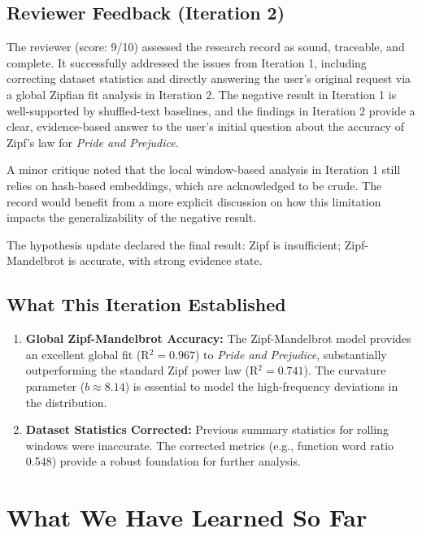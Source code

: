 \documentclass[11pt,letterpaper]{article}
\begin{document}
\subsection{Reviewer Feedback (Iteration 2)}

The reviewer (score: 9/10) assessed the research record as sound, traceable, and complete. It successfully addressed the issues from Iteration 1, including correcting dataset statistics and directly answering the user's original request via a global Zipfian fit analysis in Iteration 2. The negative result in Iteration 1 is well-supported by shuffled-text baselines, and the findings in Iteration 2 provide a clear, evidence-based answer to the user's initial question about the accuracy of Zipf's law for \textit{Pride and Prejudice}.

A minor critique noted that the local window-based analysis in Iteration 1 still relies on hash-based embeddings, which are acknowledged to be crude. The record would benefit from a more explicit discussion on how this limitation impacts the generalizability of the negative result.

The hypothesis update declared the final result: Zipf is insufficient; Zipf-Mandelbrot is accurate, with strong evidence state.

\subsection{What This Iteration Established}

\begin{enumerate}
\item \textbf{Global Zipf-Mandelbrot Accuracy:} The Zipf-Mandelbrot model provides an excellent global fit (R$^2=0.967$) to \textit{Pride and Prejudice}, substantially outperforming the standard Zipf power law (R$^2=0.741$). The curvature parameter ($b \approx 8.14$) is essential to model the high-frequency deviations in the distribution.
\item \textbf{Dataset Statistics Corrected:} Previous summary statistics for rolling windows were inaccurate. The corrected metrics (e.g., function word ratio 0.548) provide a robust foundation for further analysis.
\end{enumerate}

\newpage

\section{What We Have Learned So Far}
\end{document}

